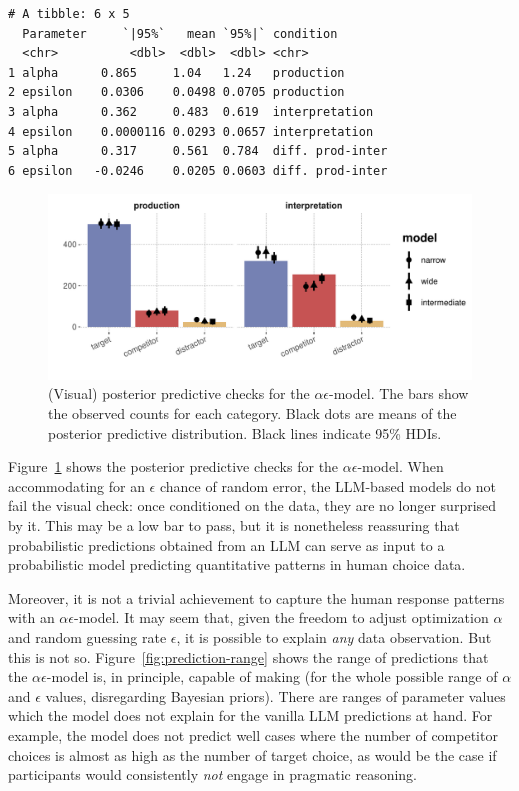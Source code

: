 \documentclass{article}
\begin{document}
\begin{verbatim}
# A tibble: 6 x 5
  Parameter     `|95%`   mean `95%|` condition
  <chr>          <dbl>  <dbl>  <dbl> <chr>
1 alpha      0.865     1.04   1.24   production
2 epsilon    0.0306    0.0498 0.0705 production
3 alpha      0.362     0.483  0.619  interpretation
4 epsilon    0.0000116 0.0293 0.0657 interpretation
5 alpha      0.317     0.561  0.784  diff. prod-inter
6 epsilon   -0.0246    0.0205 0.0603 diff. prod-inter
\end{verbatim}

\begin{figure}[t]
  \centering

  \includegraphics[width = 0.9 \textwidth]{00-pics/PPC-alpha-eps-model.pdf}

    \caption{(Visual) posterior predictive checks for the $\alpha\epsilon$-model.
    The bars show the observed counts for each category.
    Black dots are means of the posterior predictive distribution.
    Black lines indicate 95\% HDIs.
  }

  \label{fig:PPC-alpha-eps-model}
\end{figure}

Figure~\ref{fig:PPC-alpha-eps-model} shows the posterior predictive checks for the \(\alpha\epsilon\)-model.
When accommodating for an \(\epsilon\) chance of random error, the LLM-based models do not fail the visual check: once conditioned on the data, they are no longer surprised by it.
This may be a low bar to pass, but it is nonetheless reassuring that probabilistic predictions obtained from an LLM can serve as input to a probabilistic model predicting quantitative patterns in human choice data.

Moreover, it is not a trivial achievement to capture the human response patterns with an $\alpha\epsilon$-model.
It may seem that, given the freedom to adjust optimization $\alpha$ and random guessing rate $\epsilon$, it is possible to explain \emph{any} data observation.
But this is not so.
Figure~\ref{fig:prediction-range} shows the range of predictions that the $\alpha\epsilon$-model is, in principle, capable of making (for the whole possible range of \(\alpha\) and \(\epsilon\) values, disregarding Bayesian priors).
There are ranges of parameter values which the model does not explain for the vanilla LLM predictions at hand.
For example, the model does not predict well cases where the number of competitor choices is almost as high as the number of target choice, as would be the case if participants would consistently \emph{not} engage in pragmatic reasoning.
\end{document}
